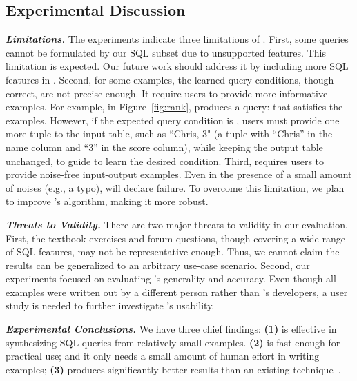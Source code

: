 \vspace{-1mm}
\subsection{Experimental Discussion}
\vspace{-1mm}

\enlargethispage{5pt}

\noindent \textbf{\textit{Limitations.}}
The experiments indicate three limitations
of \ourtool. First, some queries
cannot be formulated by our SQL subset
due to unsupported features. This limitation is expected.
Our future work
should address it by including more SQL
features in \ourtool.
Second, for some examples, the learned query
conditions, though correct, are not precise
enough. It require users to provide more informative examples.
For example, in Figure~\ref{fig:rank}, \ourtool produces a 
query: 
that satisfies the examples. However, if
the expected query condition 
is , users must provide
one more tuple to the input table, such as ``Chris, 3"
(a tuple with ``Chris'' in the name column and ``3''
in the score column), while keeping the output table
unchanged, 
to guide \ourtool to learn the desired condition.
Third, \ourtool requires
users to provide noise-free input-output examples.
Even in the presence of a small amount of 
noises (e.g., a typo), \ourtool will declare failure.
To overcome this limitation, we plan to improve \ourtool
's algorithm, making it more robust.

\vspace{.5mm}
\noindent \textbf{\textit{Threats to Validity.}}
There are two major threats to validity
in our evaluation. First, the \exnum textbook exercises
and \pnum forum questions, though covering
a wide range of SQL features, may not be representative enough.
Thus, we cannot claim the results can be generalized to an
arbitrary use-case scenario. Second, our
experiments focused on evaluating \ourtool's generality 
and accuracy. Even though all examples were written
out by a different person rather than \ourtool's developers,
a user study is needed to further investigate
\ourtool's usability.


\vspace{.5mm}
\noindent \textbf{\textit{Experimental Conclusions.}}
We have three chief findings: \textbf{(1)}
\ourtool is effective in synthesizing SQL queries
from relatively small examples.
\textbf{(2)} \ourtool is fast enough for practical use;
and it only needs a small amount of human
effort in writing examples;
\textbf{(3)} \ourtool produces significantly better results
than an existing technique~\cite{Tran:2009}.





